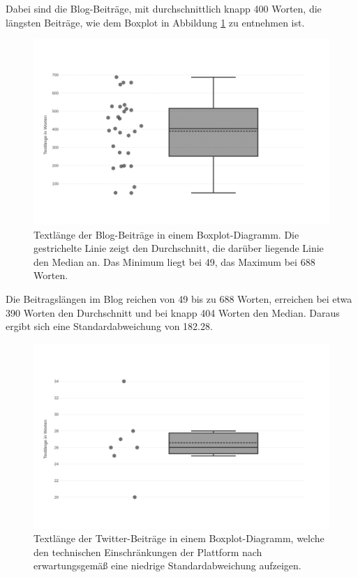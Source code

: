 Dabei sind die Blog-Beiträge, mit durchschnittlich knapp 400 Worten, die längsten Beiträge, wie dem Boxplot in Abbildung \ref{fig:wortlaengebl} zu entnehmen ist.

\begin{figure}[h]
    \centering
    \includegraphics[width=\textwidth]{img/plots/bl.png}
    \caption{Textlänge der Blog-Beiträge in einem Boxplot-Diagramm. Die gestrichelte Linie zeigt den Durchschnitt, die darüber liegende Linie den Median an. Das Minimum liegt bei 49, das Maximum bei 688 Worten.}
    \label{fig:wortlaengebl}
\end{figure}

Die Beitragslängen im Blog reichen von 49 bis zu 688 Worten, erreichen bei etwa 390 Worten den Durchschnitt und bei knapp 404 Worten den Median. Daraus ergibt sich eine Standardabweichung von 182.28.

\begin{figure}[h]
    \centering
    \includegraphics[width=\textwidth]{img/plots/tw.png}
    \caption{Textlänge der Twitter-Beiträge in einem Boxplot-Diagramm, welche den technischen Einschränkungen der Plattform nach erwartungsgemäß eine niedrige Standardabweichung aufzeigen.}
    \label{fig:wortlaengetw}
\end{figure}

